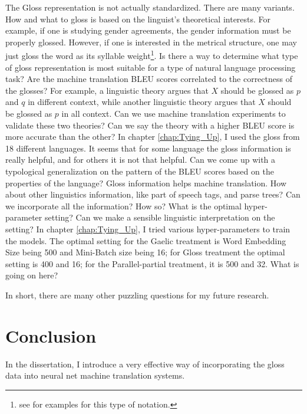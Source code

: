 \documentclass[final]{ua-thesis}
\numberwithin{equation}{section}
\begin{document}
\begin{exe}
\ex
	\begin{xlist}
	\ex The Gloss representation is not actually standardized. There are many variants. How and what to gloss is based on the linguist's theoretical interests. For example, if one is studying gender agreements, the gender information must be properly glossed. However, if one is interested in the metrical structure, one may just gloss the word as its syllable weight\footnote{see \citet{Mohsen} for examples for this type of notation.}. Is there a way to determine what type of gloss representation is most suitable for a type of natural language processing task?
	\ex Are the machine translation BLEU scores correlated to the correctness of the glosses? For example, a linguistic theory argues that $X$ should be glossed as $p$ and $q$ in different context, while another linguistic theory argues that $X$ should be glossed as $p$ in all context. Can we use machine translation experiments to validate these two theories? Can we say the theory with a higher BLEU score is more accurate than the other? 
	\ex In chapter \ref{chap:Tying_Up}, I used the gloss from 18 different languages. It seems that for some language the gloss information is really helpful, and for others it is not that helpful. Can we come up with a typological generalization on the pattern of the BLEU scores based on the properties of the language?  
	\ex Gloss information helps machine translation. How about other linguistics information, like part of speech tags, and parse trees? Can we incorporate all the information? How so? 
	\ex What is the optimal hyper-parameter setting? Can we make a sensible linguistic interpretation on the setting? In chapter \ref{chap:Tying_Up}, I tried various hyper-parameters to train the models. The optimal setting for the Gaelic treatment is Word Embedding Size being 500 and Mini-Batch size being 16; for Gloss treatment the optimal setting is 400 and 16; for the Parallel-partial treatment, it is 500 and 32. What is going on here?    
	\end{xlist}
\end{exe}

In short, there are many other puzzling questions for my future research. 

\section{Conclusion}

In the dissertation, I introduce a very effective way of incorporating the gloss data into neural net machine translation systems.
\end{document}
